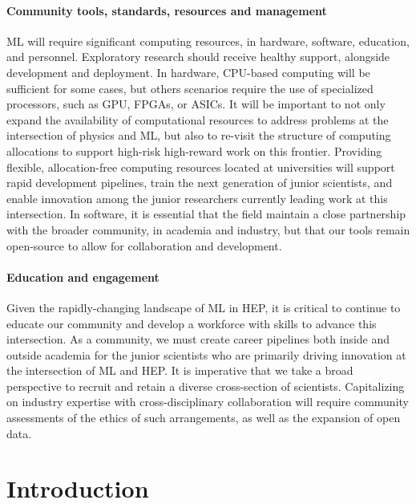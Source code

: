\documentclass[submission,Phys]{SciPost}
\begin{document}
\paragraph{Community tools, standards, resources and management}
ML will require significant computing resources, in hardware, software, education, and personnel. Exploratory research should receive healthy support, alongside development and deployment.
In hardware, CPU-based computing will be sufficient for some cases, but others scenarios require the use of specialized processors, such as GPU, FPGAs, or ASICs.  It will be important to not only expand the availability of computational resources to address problems at the intersection of physics and ML, but also to re-visit the structure of computing allocations to support high-risk high-reward work on this frontier. Providing flexible, allocation-free computing resources located at universities will support rapid development pipelines, train the next generation of junior scientists, and enable innovation among the junior researchers currently leading work at this intersection. In software, it is essential that the field maintain a close partnership with the broader community, in academia and industry, but that our tools remain open-source to allow for collaboration and development.

\paragraph{Education and engagement}
Given the rapidly-changing landscape of ML in HEP, it is critical to continue to educate our community and develop a workforce with skills to advance this intersection. As a community, we must create career pipelines both inside and outside academia for the junior scientists who are primarily driving innovation at the intersection of ML and HEP. It is imperative that we take a broad perspective to recruit and retain a diverse cross-section of scientists. Capitalizing on industry expertise with cross-disciplinary collaboration will require community assessments of the ethics of such arrangements, as well as the expansion of open data.


\clearpage

\section{Introduction}
\label{sec:intro}
\end{document}

